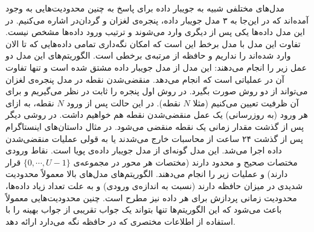 مدل‌های مختلفی شبیه به جویبار داده برای پاسخ به چنین محدودیت‌هایی به وجود آمده‌اند که در این‌جا به ۳ مدل جویبار داده، پنجره‌ی لغزان و گردان‌در اشاره می‌کنیم.
 در این مدل داده‌ها یکی پس از دیگری وارد می‌شوند و ترتیب ورود داده‌ها مشخص نیست. تفاوت این مدل با مدل برخط این است که امکان نگه‌داری تمامی داده‌هایی که تا الان وارد شده‌اند را نداریم و حافظه از مرتبه‌ی برخطی است. الگوریتم‌های این مدل دو عمل زیر را انجام می‌دهند:
 این مدل از مدل جویبار داده مشتق شده است و تنها تفاوت آن در عملیاتی است که انجام می‌دهد.
منقضی‌شدن نقطه در مدل پنجره‌ی لغزان می‌تواند از دو روش صورت بگیرد. در روش اول پنجره را ثابت در نظر می‌گیریم و برای آن ظرفیت تعیین می‌کنیم (مثلا $N$ نقطه). در این حالت پس از ورود $N$ نقطه، به ازای هر ورود (به روزرسانی) یک عمل منقضی‌شدن نقطه هم خواهیم داشت. در روشی دیگر پس از گذشت مقدار زمانی یک نقطه منقضی می‌شود. در مثال  داستان‌های اینستاگرام پس از گذشت ۲۴ ساعت از محاسبات خارج می‌شدند یا به قولی عملیات منقضی‌شدن داده اجرا می‌شد.
 این مدل گونه‌ای از مدل جویبار داده‌ی پویا است. نقاط ورودی مختصات صحیح  و محدود دارند (مختصات هر محور در مجموعه‌ی 
$ \{ 0, \cdots, U-1\}$ 
قرار دارند) و عملیات زیر را انجام می‌دهند.
الگوریتم‌های مدل‌های بالا معمولاً محدودیت شدیدی در میزان حافظه دارند (نسبت به اندازه‌ی ورودی) و به علت تعداد زیاد داده‌ها، محدودیت زمانی پردازش برای هر داده نیز مطرح است. چنین محدودیت‌هایی معمولاً باعث می‌شود که این الگوریتم‌ها تنها بتواند یک جواب تقریبی از جواب بهینه را با استفاده از اطلاعات مختصری که در حافظه نگه می‌دارد ارائه دهد.

